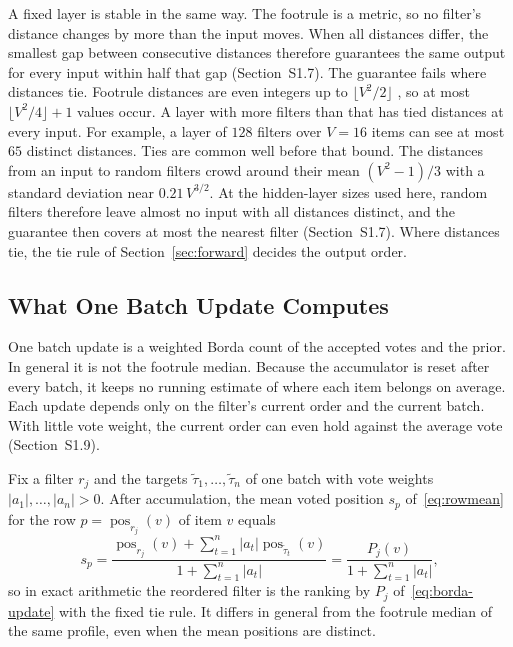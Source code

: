 A fixed layer is stable in the same way. The footrule is a metric, so no filter's distance changes by more than the input moves. When all distances differ, the smallest gap between consecutive distances therefore guarantees the same output for every input within half that gap (Section~S1.7). The guarantee fails where distances tie. Footrule distances are even integers up to $\lfloor V^2/2\rfloor$ \citep{diaconis1977footrule}, so at most $\lfloor V^2/4\rfloor+1$ values occur. A layer with more filters than that has tied distances at every input. For example, a layer of $128$ filters over $V=16$ items can see at most $65$ distinct distances. Ties are common well before that bound. The distances from an input to random filters crowd around their mean $(V^2-1)/3$ with a standard deviation near $0.21\,V^{3/2}$. At the hidden-layer sizes used here, random filters therefore leave almost no input with all distances distinct, and the guarantee then covers at most the nearest filter (Section~S1.7). Where distances tie, the tie rule of Section~\ref{sec:forward} decides the output order.

\subsection{What One Batch Update Computes}\label{sec:theory-aggregation}

One batch update is a weighted Borda count of the accepted votes and the prior. In general it is not the footrule median. Because the accumulator is reset after every batch, it keeps no running estimate of where each item belongs on average. Each update depends only on the filter's current order and the current batch. With little vote weight, the current order can even hold against the average vote (Section~S1.9).

\begin{proposition}\label{prop:batch-borda}
Fix a filter $r_j$ and the targets $\tilde\tau_1,\dots,\tilde\tau_n$ of one batch with vote weights $|a_1|,\dots,|a_n|>0$. After accumulation, the mean voted position $s_p$ of~\eqref{eq:rowmean} for the row $p=\operatorname{pos}_{r_j}(v)$ of item $v$ equals
\begin{equation}\label{eq:rowmean-borda}
s_p=\frac{\operatorname{pos}_{r_j}(v)+\sum_{t=1}^{n}|a_t|\operatorname{pos}_{\tilde\tau_t}(v)}{1+\sum_{t=1}^{n}|a_t|}=\frac{P_j(v)}{1+\sum_{t=1}^{n}|a_t|},
\end{equation}
so in exact arithmetic the reordered filter is the ranking by $P_j$ of~\eqref{eq:borda-update} with the fixed tie rule. It differs in general from the footrule median of the same profile, even when the mean positions are distinct.
\end{proposition}

